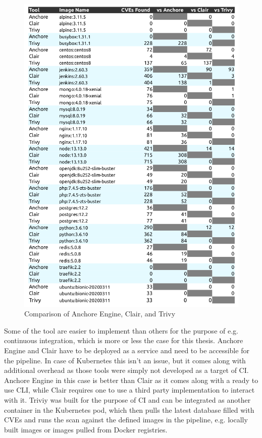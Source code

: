 \begin{figure}[H]
    \centering
    \includegraphics[scale=0.5]{graphics/Docker-Image-Static-Analysis-Tool-Comparison-Table.png}
    \caption{Comparison of Anchore Engine, Clair, and Trivy}
    \label{fig:docker_comparison}
\end{figure}

Some of the tool are easier to implement than others for the purpose of e.g. continuous integration, which is more or less the case for this thesis. Anchore Engine and Clair have to be deployed as a service and need to be accessible for the pipeline. In case of Kubernetes this isn't an issue, but it comes along with additional overhead as those tools were simply not developed as a target of CI. Anchore Engine in this case is better than Clair as it comes along with a ready to use CLI, while Clair requires one to use a third party implementation to interact with it. Triviy was built for the purpose of CI and can be integrated as another container in the Kubernetes pod, which then pulls the latest database filled with CVEs and runs the scan against the defined images in the pipeline, e.g. locally built images or images pulled from Docker registries.

